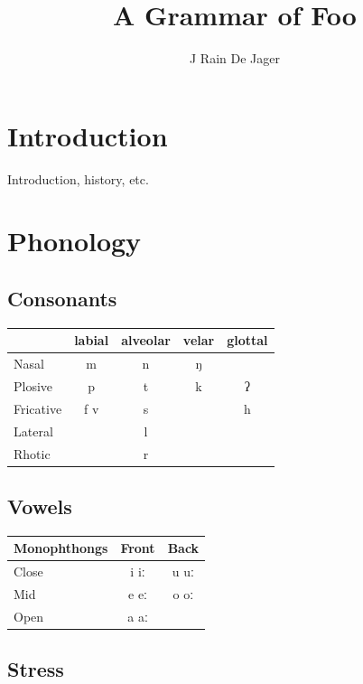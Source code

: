 \documentclass{clgrammar}
\title{A Grammar of Foo}
\author{J Rain De Jager}
\begin{document}
\maketitle

\tableofcontents

\mainmatter
\chapter{Introduction}

Introduction, history, etc.

\chapter{Phonology}

\section{Consonants}

\begin{center}
    \begin{tabular}{l|c|c|c|c}
        & labial & alveolar & velar & glottal \\
        \hline
        Nasal & m & n & ŋ & \\
        Plosive & p & t & k & ʔ \\
        Fricative & f v & s & & h \\
        Lateral & & l & & \\
        Rhotic & & r & &
    \end{tabular}
\end{center}

\section{Vowels}

\begin{center}
    \begin{tabular}{l|c|c}
        Monophthongs & Front & Back \\
        \hline
        Close & i iː & u uː \\
        Mid & e eː & o oː \\
        Open & a aː
    \end{tabular}
\end{center}

\section{Stress}
\end{document}
